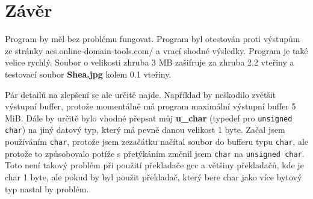 \documentclass[12pt]{article}
\begin{document}
\section{Závěr}
Program by měl bez problému fungovat. Program byl otestován proti výstupům
ze stránky aes.online-domain-tools.com/ a vrací shodné výsledky. Program 
je také velice rychlý. Soubor o velikosti zhruba 3 MB zašifruje za zhruba
2.2 vteřiny a testovací soubor \textbf{Shea.jpg} kolem 0.1 vteřiny.

Pár detailů na zlepšení se ale určitě najde. Například by neškodilo zvětšit
výstupní buffer, protože momentálně má program maximální výstupní buffer 5 MiB.
Dále by určitě bylo vhodné přepsat můj \textbf{u\_char} (typedef pro
\texttt{unsigned char}) na jiný datový typ,
který má pevně danou velikost 1 byte. Začal jsem používáním \texttt{char}, 
protože jsem zezačátku načítal soubor do bufferu typu \texttt{char}, ale
protože to způsobovalo potíže s přetýkáním změnil jsem \texttt{char} na
\texttt{unsigned char}. Toto není takový problém při použití překladače gcc
a většiny překladačů, kde je char 1 byte, ale pokud by byl použit překladač,
který bere char jako více bytový typ nastal by problém.
%
\end{document}
